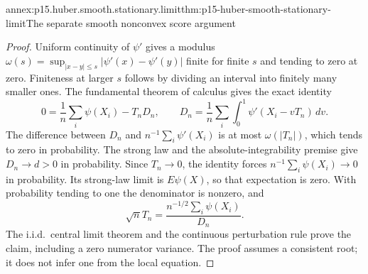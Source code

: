 \begin{annexitem}{annex:p15.huber.smooth.stationary.limit}{thm:p15-huber-smooth-stationary-limit}{The separate smooth nonconvex score argument}
\begin{proof}
Uniform continuity of \(\psi'\) gives a modulus
\(\omega(s)=\sup_{|x-y|\leq s}|\psi'(x)-\psi'(y)|\) finite for
finite \(s\) and tending to zero at zero. Finiteness at larger
\(s\) follows by dividing an interval into finitely many smaller ones.
The fundamental theorem of calculus gives the exact identity
\[
 0=\frac1n\sum_i\psi(X_i)-T_n D_n,\qquad
 D_n=\frac1n\sum_i\int_0^1\psi'(X_i-vT_n)\,dv .
\]
The difference between \(D_n\) and \(n^{-1}\sum_i\psi'(X_i)\)
is at most \(\omega(|T_n|)\), which tends to zero in probability.
The strong law and the absolute-integrability premise give
\(D_n\to d>0\) in probability.
Since \(T_n\to0\), the identity forces \(n^{-1}\sum_i\psi(X_i)\to0\)
in probability. Its strong-law limit is \(E\psi(X)\), so that
expectation is zero. With probability tending to one the denominator
is nonzero, and
\[
 \sqrt n T_n=
       \frac{n^{-1/2}\sum_i\psi(X_i)}{D_n}.
\]
The i.i.d.\ central limit theorem and the continuous perturbation
rule prove the claim, including a zero numerator variance.
The proof assumes a consistent root; it does not infer one from
the local equation.
\end{proof}
\end{annexitem}


